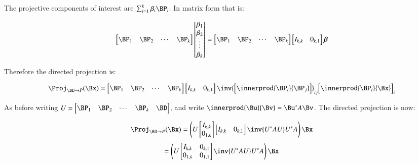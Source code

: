 \documentclass{article}      %
\newcommand{\Bbeta}[0]{\boldsymbol{\beta}}
\begin{document}
The projective components of interest are $\sum_{i=1}^k \beta_i \BP_i$.  In matrix form that is:

\begin{align*}
\begin{bmatrix}
\BP_1 & \BP_2 & \cdots & \BP_k
\end{bmatrix}
\begin{bmatrix}
\beta_1 \\
\beta_2 \\
\vdots \\
\beta_k
\end{bmatrix}
=
\begin{bmatrix}
\BP_1 & \BP_2 & \cdots & \BP_k
\end{bmatrix}
\begin{bmatrix}
I_{k,k} & 0_{k,1}
\end{bmatrix}
\Bbeta
\end{align*}

Therefore the directed projection is:

\begin{equation}
\Proj_{\BD \rightarrow P}(\Bx) 
=
\begin{bmatrix}
\BP_1 & \BP_2 & \cdots & \BP_k
\end{bmatrix}
\begin{bmatrix}
I_{k,k} & 0_{k,1}
\end{bmatrix}
\inv{
\begin{bmatrix}
\innerprod{\BP_i}{\BP_j}
\end{bmatrix}
}_{ij}
{
\begin{bmatrix}
\innerprod{\BP_i}{\Bx}
\end{bmatrix}
}_i
\end{equation}

As before writing $U = 
\begin{bmatrix}
\BP_1 & \BP_2 & \cdots & \BP_k & \BD
\end{bmatrix}
$, and write $\innerprod{\Bu}{\Bv} = \Bu^* A \Bv$.  The directed projection is now:

\begin{equation*}
\Proj_{\BD \rightarrow P}(\Bx) 
=
\left(
U 
\begin{bmatrix}
I_{k,k} \\
0_{1,k} \\
\end{bmatrix}
\begin{bmatrix}
I_{k,k} & 0_{k,1}
\end{bmatrix}
\inv{
U^* A U
}
U^* A 
\right)
\Bx
\end{equation*}
\begin{equation}
=
\left(
U 
\begin{bmatrix}
I_{k,k} & 0_{k,1} \\
0_{1,k} & 0_{1,1} \\
\end{bmatrix}
\inv{
U^* A U
}
U^* A 
\right)
\Bx
\end{equation}
\end{document}
